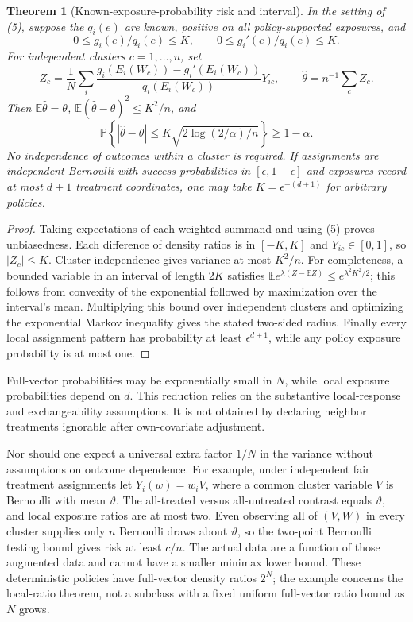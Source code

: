 \documentclass[11pt,a4paper]{article}
\newtheorem{theorem}{Theorem}[section]
\theoremstyle{definition}
\theoremstyle{remark}
\newcommand{\E}{\mathbb E}
\newcommand{\Prb}{\mathbb P}
\begin{document}
\begin{theorem}[Known-exposure-probability risk and interval]
In the setting of (5), suppose the $q_i(e)$ are known, positive on all policy-supported exposures, and
\[
 0\le g_i(e)/q_i(e)\le K,\qquad
 0\le g_i'(e)/q_i(e)\le K.
\]
For independent clusters $c=1,\ldots,n$, set
\[
 Z_c=\frac1N\sum_i
 \frac{g_i(E_i(W_c))-g_i'(E_i(W_c))}{q_i(E_i(W_c))}Y_{ic},
 \qquad \hat\theta=n^{-1}\sum_c Z_c.
\]
Then $\E\hat\theta=\theta$, $\E(\hat\theta-\theta)^2\le K^2/n$, and
\[
 \Prb\left\{|\hat\theta-\theta|\le
 K\sqrt{2\log(2/\alpha)/n}\right\}\ge1-\alpha.
\]
No independence of outcomes within a cluster is required. If assignments are independent Bernoulli with success probabilities in $[\epsilon,1-\epsilon]$ and exposures record at most $d+1$ treatment coordinates, one may take $K=\epsilon^{-(d+1)}$ for arbitrary policies.
\end{theorem}
\begin{proof}
Taking expectations of each weighted summand and using (5) proves unbiasedness. Each difference of density ratios is in $[-K,K]$ and $Y_{ic}\in[0,1]$, so $|Z_c|\le K$. Cluster independence gives variance at most $K^2/n$. For completeness, a bounded variable in an interval of length $2K$ satisfies
$\E e^{\lambda(Z-\E Z)}\le e^{\lambda^2K^2/2}$; this follows from convexity of the exponential followed by maximization over the interval's mean. Multiplying this bound over independent clusters and optimizing the exponential Markov inequality gives the stated two-sided radius. Finally every local assignment pattern has probability at least $\epsilon^{d+1}$, while any policy exposure probability is at most one.
\end{proof}

Full-vector probabilities may be exponentially small in $N$, while local exposure probabilities depend on $d$. This reduction relies on the substantive local-response and exchangeability assumptions. It is not obtained by declaring neighbor treatments ignorable after own-covariate adjustment.

Nor should one expect a universal extra factor $1/N$ in the variance without assumptions on outcome dependence. For example, under independent fair treatment assignments let $Y_i(w)=w_iV$, where a common cluster variable $V$ is Bernoulli with mean $\vartheta$. The all-treated versus all-untreated contrast equals $\vartheta$, and local exposure ratios are at most two. Even observing all of $(V,W)$ in every cluster supplies only $n$ Bernoulli draws about $\vartheta$, so the two-point Bernoulli testing bound gives risk at least $c/n$. The actual data are a function of those augmented data and cannot have a smaller minimax lower bound. These deterministic policies have full-vector density ratios $2^N$; the example concerns the local-ratio theorem, not a subclass with a fixed uniform full-vector ratio bound as $N$ grows.
\end{document}
